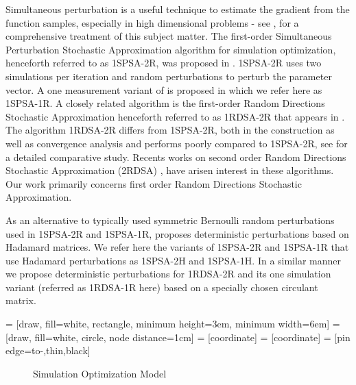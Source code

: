 \documentclass[letterpaper, 10 pt, conference]{ieeeconf}  %
\begin{document}
Simultaneous perturbation is a useful technique to estimate the gradient from the function 
samples, especially in high dimensional problems - see \cite{bhatnagar-book},
\cite{spallbook} for a comprehensive treatment of this subject matter.
The first-order Simultaneous Perturbation Stochastic Approximation algorithm for 
simulation optimization, henceforth referred to as 1SPSA-2R, was 
proposed in \cite{spall}. 1SPSA-2R uses two simulations per iteration and random 
perturbations to perturb the parameter vector. 
A one measurement variant of \cite{spall} is proposed in \cite{spall2} which we refer here
as 1SPSA-1R.
A closely related algorithm is the first-order Random Directions 
Stochastic Approximation henceforth referred to as 1RDSA-2R that appears in
\cite[pp.~58-60]{kushcla}. The algorithm 1RDSA-2R differs from 1SPSA-2R, both in the 
construction as well as convergence analysis and performs poorly compared to 1SPSA-2R, see 
\cite{chin1997comparative} for a detailed comparative study. 
Recents works on second order Random Directions Stochastic 
Approximation (2RDSA) \cite{prashanth2015rdsa},\cite{reddy2016improved} have arisen interest in 
these algorithms. Our work primarily concerns first order Random Directions Stochastic Approximation.

As an alternative to typically used symmetric Bernoulli random perturbations used in 
1SPSA-2R and 1SPSA-1R, \cite{bhatnagar2003two} proposes deterministic perturbations 
based on Hadamard matrices. We refer here the variants of 1SPSA-2R and 1SPSA-1R that 
use Hadamard perturbations as 1SPSA-2H and 1SPSA-1H. 
In a similar manner we propose deterministic perturbations
for 1RDSA-2R and its  one simulation variant (referred as 1RDSA-1R here) based on a
specially chosen circulant matrix.


 = [draw, fill=white, rectangle,
   minimum height=3em, minimum width=6em]
 = [draw, fill=white, circle, node distance=1cm]
 = [coordinate]
 = [coordinate]
 = [pin edge={to-,thin,black}]
\begin{figure}[t]
    \centering
{}
\caption{Simulation Optimization Model}
\label{fig:so}
\end{figure}
\end{document}
